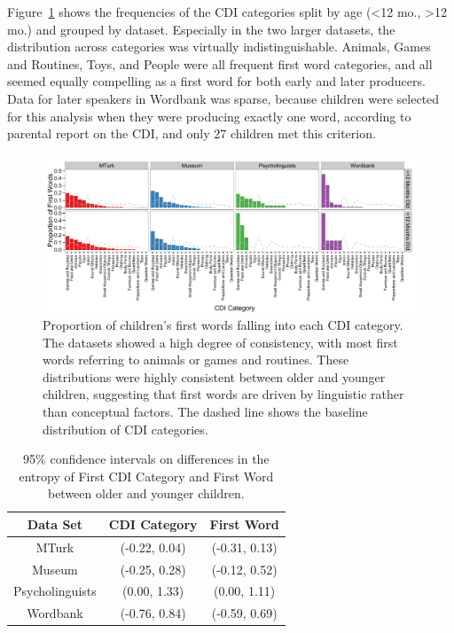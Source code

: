 \documentclass[10pt,letterpaper]{article}
\begin{document}
Figure~\ref{fig:cdi_cats} shows the frequencies of the CDI categories split by age (\textless{12 mo.}, \textgreater{12 mo.}) and grouped by dataset. Especially in the two larger datasets, the distribution across categories was virtually indistinguishable. Animals, Games and Routines, Toys, and People were all frequent first word categories, and all seemed equally compelling as a first word for both early and later producers. Data for later speakers in Wordbank was sparse, because children were selected for this analysis when they were producing exactly one word, according to parental report on the CDI, and only 27 children met this criterion.

\begin{figure}[t]
\begin{center}
\includegraphics[width = .9\textwidth]{figures/Figure2.pdf}
\end{center}
\caption{Proportion of children's first words falling into each CDI category. The datasets showed a high degree of consistency, with most first words referring to animals or games and routines. These distributions were highly consistent between older and younger children, suggesting that first words are driven by linguistic rather than conceptual factors. The dashed line shows the baseline distribution of CDI categories.}
\label{fig:cdi_cats}
\vspace{-1.5em}
\end{figure}

\begin{table}[tb]
\centering
\begin{tabular}{ccc}
\hline
Data Set & CDI Category & First Word \\ 
\hline
  MTurk & (-0.22, 0.04) & (-0.31, 0.13) \\ 
  Museum & (-0.25, 0.28) & (-0.12, 0.52) \\ 
  Psycholinguists & (0.00, 1.33) & (0.00, 1.11) \\ 
  Wordbank & (-0.76, 0.84) & (-0.59, 0.69) \\ 
   \hline
\end{tabular}
\caption{\label{tab:ent_diffs} 95\% confidence intervals on differences in the entropy of First CDI Category and First Word between older and younger children.}
\vspace{-2.65em}
\end{table}
\end{document}
